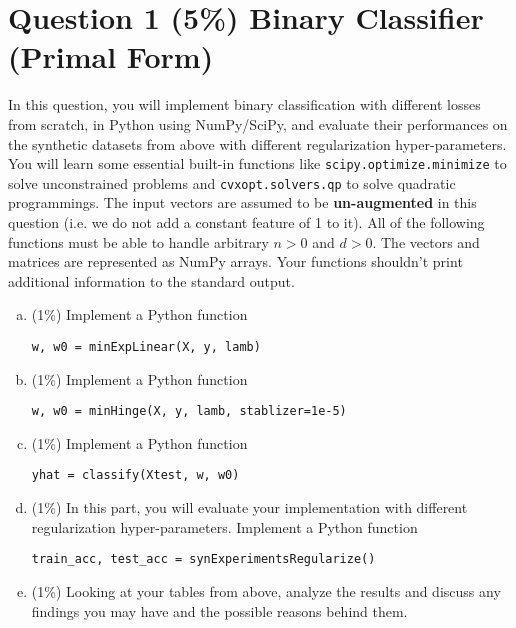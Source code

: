 \documentclass[12pt]{article}
\newcounter{ques}
\begin{document}
\section*{Question 1 (5\%) Binary Classifier (Primal Form)}
In this question, you will implement binary classification with different losses from scratch, in Python using NumPy/SciPy, and evaluate their performances on the synthetic datasets from above with different regularization hyper-parameters. You will learn some essential built-in functions like \texttt{scipy.optimize.minimize} to solve unconstrained problems and \texttt{cvxopt.solvers.qp} to solve quadratic programmings.
The input vectors are assumed to be \textbf{un-augmented} in this question (i.e. we do not add a constant feature of 1 to it). All of the following functions must be able to handle arbitrary $n > 0$ and $d > 0$. The vectors and matrices are represented as NumPy arrays. Your functions shouldn't print additional information to the
standard output.
\begin{enumerate}[(a)]
  \item (1\%) Implement a Python function 
  \begin{center}
    \texttt{w, w0 = minExpLinear(X, y, lamb)}
  \end{center}
  \item (1\%) Implement a Python function
    \begin{center}
      \texttt{w, w0 = minHinge(X, y, lamb, stablizer=1e-5)}
    \end{center}
  \item (1\%) Implement a Python function 
  \begin{center}
    \texttt{yhat = classify(Xtest, w, w0)}
  \end{center}
  \item (1\%) In this part, you will evaluate your implementation with different regularization hyper-parameters. Implement a Python function 
  \begin{center}
    \texttt{train\_acc, test\_acc = synExperimentsRegularize()}
  \end{center}
  \item (1\%) Looking at your tables from above, analyze the results and discuss any findings you may have and the possible reasons behind them.
\end{enumerate}
\end{document}
